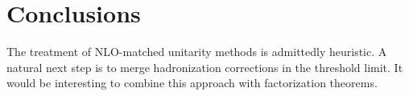 \section{Conclusions}\label{sec:conclusions}

The treatment of NLO-matched unitarity methods is admittedly heuristic.
A natural next step is to merge hadronization corrections in the
threshold limit. It would be interesting to combine this approach with
factorization theorems.

